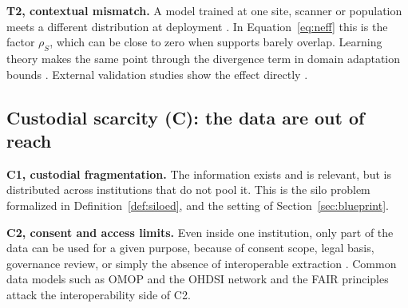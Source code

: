 \documentclass[acmsmall,screen,review]{acmart}
\theoremstyle{acmdefinition}
\begin{document}
\textbf{T2, contextual mismatch.} A model trained at one site, scanner or population meets a different distribution at deployment \cite{finlayson2021clinician,koh2021wilds}. In Equation~\eqref{eq:neff} this is the factor $\rho_S$, which can be close to zero when supports barely overlap. Learning theory makes the same point through the divergence term in domain adaptation bounds \cite{bendavid2010theory}. External validation studies show the effect directly \cite{debray2015new,wong2021external,zech2018variable}.

\subsection{Custodial scarcity (C): the data are out of reach}

\textbf{C1, custodial fragmentation.} The information exists and is relevant, but is distributed across institutions that do not pool it. This is the silo problem formalized in Definition~\ref{def:siloed}, and the setting of Section~\ref{sec:blueprint}.

\textbf{C2, consent and access limits.} Even inside one institution, only part of the data can be used for a given purpose, because of consent scope, legal basis, governance review, or simply the absence of interoperable extraction \cite{cohen2018hipaa,gdpr2016,mandel2016smart}. Common data models such as OMOP and the OHDSI network \cite{hripcsak2015observational,overhage2012validation} and the FAIR principles \cite{wilkinson2016fair} attack the interoperability side of C2.
\end{document}

